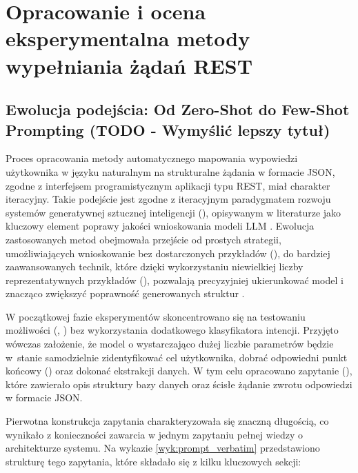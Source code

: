 \chapter{Opracowanie i ocena eksperymentalna metody wypełniania żądań REST}

\section{Ewolucja podejścia: Od Zero-Shot do Few-Shot Prompting (TODO - Wymyślić lepszy tytuł)}

Proces opracowania metody automatycznego mapowania wypowiedzi użytkownika w języku naturalnym na strukturalne żądania w formacie JSON, zgodne z interfejsem programistycznym aplikacji typu REST, miał charakter iteracyjny. Takie podejście jest zgodne z iteracyjnym paradygmatem rozwoju systemów generatywnej sztucznej inteligencji (), opisywanym w literaturze jako kluczowy element poprawy jakości wnioskowania modeli LLM \cite{brown2020language,ouyang2022training}. Ewolucja zastosowanych metod obejmowała przejście od prostych strategii, umożliwiających wnioskowanie bez dostarczonych przykładów (), do bardziej zaawansowanych technik, które dzięki wykorzystaniu niewielkiej liczby reprezentatywnych przykładów (), pozwalają precyzyjniej ukierunkować model i znacząco zwiększyć poprawność generowanych struktur \cite{brown2020language,liu2023pre}.

W początkowej fazie eksperymentów skoncentrowano się na testowaniu możliwości  (, ) bez wykorzystania dodatkowego klasyfikatora intencji. Przyjęto wówczas założenie, że model o wystarczająco dużej liczbie parametrów będzie w~stanie samodzielnie zidentyfikować cel użytkownika, dobrać odpowiedni punkt końcowy () oraz dokonać ekstrakcji danych. W tym celu opracowano zapytanie (), które zawierało opis struktury bazy danych oraz ścisłe żądanie zwrotu odpowiedzi w formacie JSON.

Pierwotna konstrukcja zapytania charakteryzowała się znaczną długością, co wynikało z konieczności zawarcia w jednym zapytaniu pełnej wiedzy o architekturze systemu. Na wykazie \ref{wyk:prompt_verbatim} przedstawiono strukturę tego zapytania, które składało się z kilku kluczowych sekcji:


